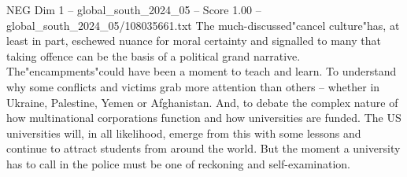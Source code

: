 \begin{textsample}{NEG Dim 1 – global\_south\_2024\_05 – Score 1.00 – global\_south\_2024\_05/108035661.txt}
The much-discussed"cancel culture"has, at least in part, eschewed nuance for moral certainty and signalled to many that taking offence can be the basis of a political grand narrative.
The"encampments"could have been a moment to teach and learn.
To understand why some conflicts and victims grab more attention than others -- whether in Ukraine, Palestine, Yemen or Afghanistan.
And, to debate the complex nature of how multinational corporations function and how universities are funded.
The US universities will, in all likelihood, emerge from this with some lessons and continue to attract students from around the world.
But the moment a university has to call in the police must be one of reckoning and self-examination.

\end{textsample}
